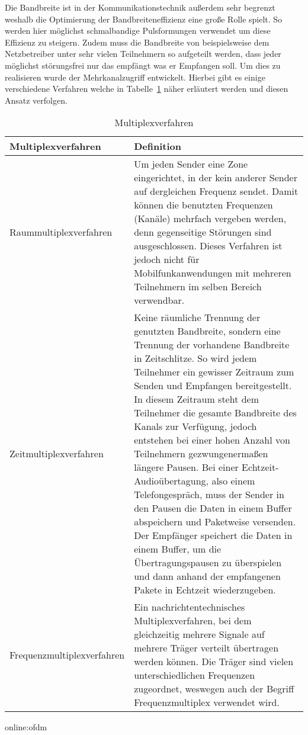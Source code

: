 Die Bandbreite ist in der Kommunikationstechnik außerdem sehr begrenzt weshalb die Optimierung der Bandbreiteneffizienz eine große Rolle spielt. So werden hier möglichst schmalbandige Pulsformungen verwendet um diese Effizienz zu steigern.\cite{howwireless} Zudem muss die Bandbreite von  beispielsweise dem Netzbetreiber unter sehr vielen Teilnehmern so aufgeteilt werden, dass jeder möglichst störungsfrei nur das empfängt was er Empfangen soll. Um dies zu realisieren wurde der Mehrkanalzugriff entwickelt. Hierbei gibt es einige verschiedene Verfahren welche in Tabelle~\ref{tab:multiplex} näher erläutert werden und diesen Ansatz verfolgen. 

\begin{table}[htb]
	\begin{center}
		\begin{tabular}{p{}  p{}}
			\toprule
			\textbf{Multiplexverfahren} &  \textbf{Definition} \\ 
			\midrule
			Raummultiplexverfahren	& Um jeden Sender eine Zone eingerichtet, in der kein anderer Sender auf dergleichen Frequenz sendet. Damit können die benutzten Frequenzen (Kanäle) mehrfach vergeben werden, denn gegenseitige Störungen sind ausgeschlossen. Dieses Verfahren ist jedoch nicht für Mobilfunkanwendungen mit mehreren Teilnehmern im selben Bereich verwendbar.\\
			\midrule
			Zeitmultiplexverfahren	& Keine räumliche Trennung der genutzten Bandbreite, sondern  eine Trennung der vorhandene Bandbreite in Zeitschlitze. So wird jedem Teilnehmer ein gewisser Zeitraum zum Senden und Empfangen bereitgestellt. In diesem Zeitraum steht dem Teilnehmer die gesamte Bandbreite  des Kanals zur Verfügung, jedoch entstehen bei einer hohen Anzahl von Teilnehmern gezwungenermaßen längere Pausen. Bei einer Echtzeit-Audioübertagung, also einem Telefongespräch, muss der Sender in den Pausen die Daten in einem Buffer abspeichern und Paketweise versenden. Der Empfänger speichert die Daten in einem Buffer, um die Übertragungspausen zu überspielen und dann anhand der empfangenen Pakete in Echtzeit wiederzugeben.\\
			\midrule
			Frequenzmultiplexverfahren	& Ein nachrichtentechnisches Multiplexverfahren, bei dem gleichzeitig mehrere Signale auf mehrere Träger verteilt übertragen werden können. Die Träger sind vielen unterschiedlichen Frequenzen zugeordnet, weswegen auch der Begriff Frequenzmultiplex verwendet wird.\\	
			\bottomrule
\end{tabular}
\caption{Multiplexverfahren}\gls{online:ofdm}\cite{NT}
\label{tab:multiplex}
\end{center}
\end{table}

